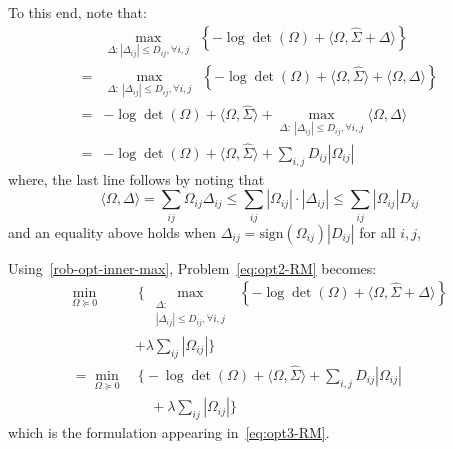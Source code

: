 To this end, note that:
\begin{equation}\label{rob-opt-inner-max}
    \begin{aligned}
&\max_{\Delta: |\Delta_{ij}| \leq D_{ij}, \forall i,j } ~~ \left \{- \log \det \left ( \Omega \right ) + \langle \Omega, \hat{\Sigma} + \Delta \rangle  \right\}\\
 =& \max_{\Delta:~|\Delta_{ij}| \leq D_{ij}, \forall i,j} ~~  \left \{- \log \det \left ( \Omega \right ) + \langle\Omega, \hat{\Sigma}\rangle + \langle\Omega, \Delta\rangle \right\} \\
 = & - \log \det \left ( \Omega \right ) + \langle \Omega, \hat{\Sigma} \rangle + \max_{\Delta:~|\Delta_{ij}| \leq D_{ij}, \forall i,j}  \langle \Omega, \Delta  \rangle \\
 =& - \log \det \left ( \Omega \right ) + \langle \Omega, \hat{\Sigma} \rangle +   \sum_{i,j} D_{ij} |\Omega_{ij}|
 \end{aligned}
\end{equation}
where, the last line follows by noting that 
$$ \langle \Omega, \Delta  \rangle = \sum_{ij} \Omega_{ij}\Delta_{ij} \leq \sum_{ij} |\Omega_{ij}|\cdot |\Delta_{ij}| \leq \sum_{ij} |\Omega_{ij}| D_{ij}$$
and an equality above holds when $\Delta_{ij} = \text{sign}(\Omega_{ij}) |D_{ij}|$ for all $i,j$,

Using~\eqref{rob-opt-inner-max}, Problem~\eqref{eq:opt2-RM} becomes:
\begin{equation*}
        \begin{aligned}
\min_{\Omega \succeq 0}~&~ \Big\{~\max_{\substack{\Delta:\\ |\Delta_{ij}| \leq D_{ij}, \forall i,j }} ~~ \left \{- \log \det \left ( \Omega \right ) + \langle \Omega, \hat{\Sigma} + \Delta \rangle  \right\} \\
& + \lambda \sum_{ij} |\Omega_{ij}| \Big\}\\  
 = \min_{\Omega \succeq 0} &~ \Big\{ - \log \det \left ( \Omega \right ) + \langle \Omega, \hat{\Sigma} \rangle +   \sum_{i,j} D_{ij} |\Omega_{ij}|  \\
 & ~~~~~ + \lambda \sum_{ij} |\Omega_{ij}|  \Big\}
    \end{aligned}
    \end{equation*}
    which is the formulation appearing in~\eqref{eq:opt3-RM}.







